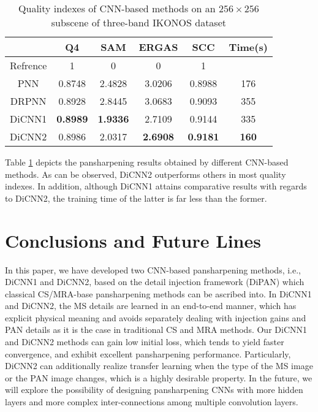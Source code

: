 \documentclass[journal]{IEEEtran}
\begin{document}
\begin{table}[htp]
\small
\caption{Quality indexes of CNN-based methods on an $256\times256$ subscene of three-band IKONOS dataset}
\centering
\begin{tabular}{c|ccccc}
\hline
{}&Q4&SAM& ERGAS &SCC&Time(s)\\
\hline
Refrence&1 &0 &0 &1&{}\\
\hline
\hline
PNN &0.8748 &2.4828 &3.0206 &0.8988&176\\
\hline
DRPNN &0.8928 &2.8445 &3.0683 &0.9093&355\\
\hline
DiCNN1 &\textbf{0.8989} &\textbf{1.9336} &2.7109 &0.9144 &335\\
\hline
DiCNN2 &0.8986&2.0317 &\textbf{2.6908}  &\textbf{0.9181} &\textbf{160}\\
\hline
\end{tabular}
\label{table:transik}
\end{table}

Table \ref{table:transik} depicts the pansharpening results obtained by different CNN-based methods. As can be observed, DiCNN2 outperforms others in most quality indexes. In addition, although DiCNN1 attains comparative results with regards to DiCNN2, the training time of the latter is far less than the former.






\section{Conclusions and Future Lines}
\label{sec:Conclusions}

In this paper, we have developed two CNN-based pansharpening methods, i.e., DiCNN1 and DiCNN2, based on the detail injection framework (DiPAN) which classical CS/MRA-base pansharpening methods can be ascribed into. In DiCNN1 and DiCNN2, the MS details are learned in an end-to-end manner, which has explicit physical meaning and avoids separately dealing with injection gains and PAN details as it is the case in traditional CS and MRA methods. Our DiCNN1 and DiCNN2 methods can gain low initial loss, which tends to  yield faster convergence, and exhibit excellent pansharpening performance. Particularly, DiCNN2 can additionally realize transfer learning when the type of the MS image or the PAN image changes, which is a highly desirable property. In the future, we will explore the possibility of designing pansharpening CNNs with more hidden layers and more complex inter-connections among multiple convolution layers.




\ifCLASSOPTIONcaptionsoff
  \newpage
\fi




\end{document}
